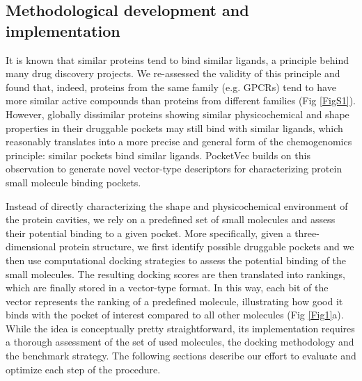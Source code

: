 


\subsection{Methodological development and implementation}

It is known that similar proteins tend to bind similar ligands\cite{klabunde_chemogenomic_2007}, a principle behind many drug discovery projects\cite{sydow_advances_2019, keiser_relating_2007, falaguera_illuminating_2023}. We re-assessed the validity of this principle and found that, indeed, proteins from the same family (e.g. GPCRs) tend to have more similar active compounds than proteins from different families (Fig \ref{FigS1}). However, globally dissimilar proteins showing similar physicochemical and shape properties in their druggable pockets may still bind with similar ligands, which reasonably translates into a more precise and general form of the chemogenomics principle: similar pockets bind similar ligands\cite{gao_comprehensive_2013}. PocketVec builds on this observation to generate novel vector-type descriptors for characterizing protein small molecule binding pockets. 

Instead of directly characterizing the shape and physicochemical environment of the protein
cavities, we rely on a predefined set of small molecules and assess their potential binding to a
given pocket. More specifically, given a three-dimensional protein structure, we first identify
possible druggable pockets and we then use computational docking strategies to assess the
potential binding of the small molecules. The resulting docking scores are then translated into
rankings, which are finally stored in a vector-type format. In this way, each bit of the vector
represents the ranking of a predefined molecule, illustrating how good it binds with the pocket of
interest compared to all other molecules (Fig \ref{Fig1}a). While the idea is conceptually pretty
straightforward, its implementation requires a thorough assessment of the set of used
molecules, the docking methodology and the benchmark strategy. The following sections
describe our effort to evaluate and optimize each step of the procedure.



